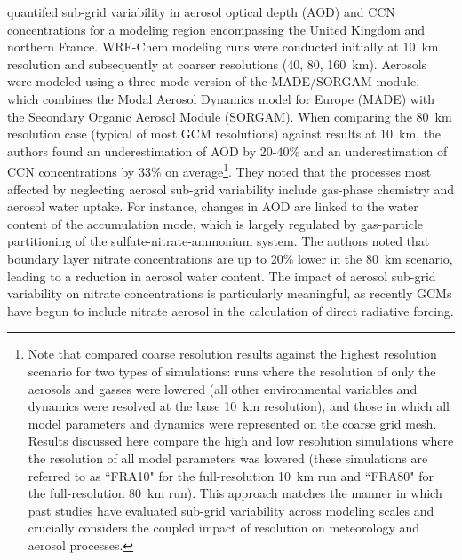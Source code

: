 \textcite{weigum_effect_2016} quantifed sub-grid variability in aerosol optical depth (AOD) and CCN concentrations for a modeling region encompassing the United Kingdom and northern France. WRF-Chem modeling runs were conducted initially at 10~km resolution and subsequently at coarser resolutions (40, 80, 160~km). Aerosols were modeled using a three-mode version of the MADE/SORGAM module, which combines the Modal Aerosol Dynamics model for Europe (MADE) with the Secondary Organic Aerosol Module (SORGAM). When comparing the 80~km resolution case (typical of most GCM resolutions) against results at 10~km, the authors found an underestimation of AOD by 20-40\% and an underestimation of CCN concentrations by 33\% on average\footnote{Note that \textcite{weigum_effect_2016} compared coarse resolution results against the highest resolution scenario for two types of simulations: runs where the resolution of only the aerosols and gasses were lowered (all other environmental variables and dynamics were resolved at the base 10~km resolution), and those in which all model parameters and dynamics were represented on the coarse grid mesh. Results discussed here compare the high and low resolution simulations where the resolution of all model parameters was lowered (these simulations are referred to as ``FRA10" for the full-resolution 10~km run and ``FRA80" for the full-resolution 80~km run). This approach matches the manner in which past studies have evaluated sub-grid variability across modeling scales and crucially considers the coupled impact of resolution on meteorology and aerosol processes.}. They noted that the processes most affected by neglecting aerosol sub-grid variability include gas-phase chemistry and aerosol water uptake. For instance, changes in AOD are linked to the water content of the accumulation mode, which is largely regulated by gas-particle partitioning of the sulfate-nitrate-ammonium system. The authors noted that boundary layer nitrate concentrations are up to 20\% lower in the 80~km scenario, leading to a reduction in aerosol water content. The impact of aerosol sub-grid variability on nitrate concentrations is particularly meaningful, as recently GCMs have begun to include nitrate aerosol in the calculation of direct radiative forcing.

